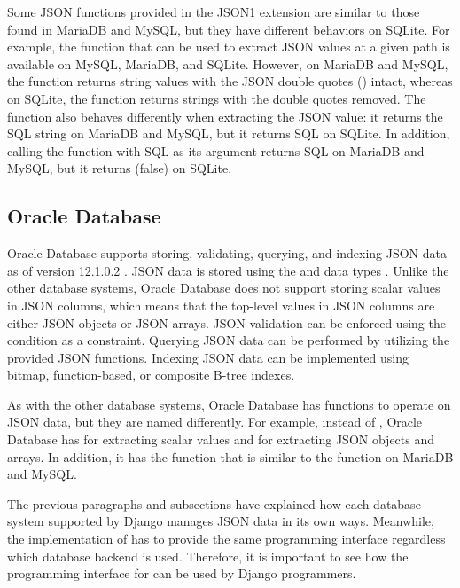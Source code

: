 Some JSON functions provided in the JSON1 extension are similar to those found
in MariaDB and MySQL, but they have different behaviors on SQLite. For example,
the  function that can be used to extract JSON values at a
given path is available on MySQL, MariaDB, and SQLite. However, on MariaDB and
MySQL, the function returns string values with the JSON double quotes
() intact, whereas on SQLite, the function returns strings with the
double quotes removed. The function also behaves differently when extracting
the JSON  value: it returns the SQL string  on
\mbox{MariaDB} and MySQL, but it returns SQL  on SQLite. In
addition, calling the  function with SQL  as its
argument returns SQL  on MariaDB and MySQL, but it returns 
(false) on SQLite.

\subsection{Oracle Database}

Oracle Database supports storing, validating, querying, and indexing JSON data
as of version 12.1.0.2 \cite{oracle:12.1.0.2}. JSON data is stored using the
 and  data types \cite{oracle:json}. Unlike the other
database systems, Oracle Database does not support storing scalar values in
JSON columns, which means that the top-level values in JSON columns are either
JSON objects or JSON arrays. JSON validation can be enforced using the  condition as a  constraint. Querying JSON data can be
performed by utilizing the provided JSON functions. Indexing JSON data can be
implemented using bitmap, function-based, or composite B-tree indexes.

As with the other database systems, Oracle Database has functions to operate on
JSON data, but they are named differently. For example, instead of
, Oracle Database has  for extracting
scalar values and  for extracting JSON objects and arrays. In
addition, it has the  function that is similar to the
 function on MariaDB and MySQL.

The previous paragraphs and subsections have explained how each database
system supported by Django manages JSON data in its own ways. Meanwhile, the
implementation of  has to provide the same programming
interface regardless which database backend is used. Therefore, it is important
to see how the programming interface for  can be used by Django
programmers.

